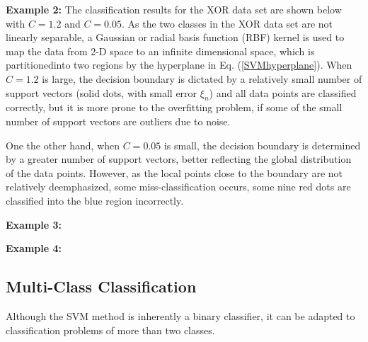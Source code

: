 \documentclass{article}
\begin{document}


{\bf Example 2:} The classification results for the XOR data set are
shown below with $C=1.2$ and $C=0.05$. As the two classes in the XOR 
data set are not linearly separable, a Gaussian or radial basis function 
(RBF) kernel is used to map the data from 2-D space to an infinite
dimensional space, which is partitionedinto two regions by the hyperplane
in Eq. (\ref{SVMhyperplane}). When $C=1.2$ is large, the decision boundary 
is dictated by a relatively small number of support vectors (solid dots, 
with small error $\xi_n$) and all data points are classified correctly, 
but it is more prone to the overfitting problem, if some of the small 
number of support vectors are outliers due to noise.

One the other hand, when $C=0.05$ is small, the decision boundary is
determined by a greater number of support vectors, better reflecting 
the global distribution of the data points. However, as the local
points close to the boundary are not relatively deemphasized, some
miss-classification occurs, some nine red dots are classified into
the blue region incorrectly.



{\bf Example 3:}


{\bf Example 4:}



\subsection{Multi-Class Classification}




Although the SVM method is inherently a binary classifier, it can
be adapted to classification problems of more than two classes. 
\end{document}
